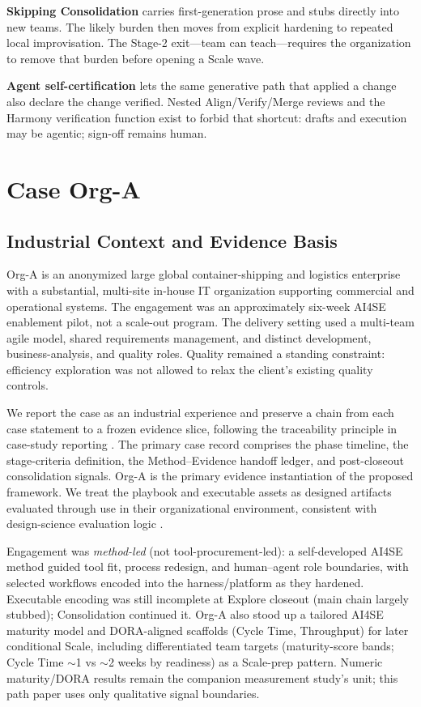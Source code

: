 \documentclass[10pt,conference]{IEEEtran}
\begin{document}
\textbf{Skipping Consolidation} carries first-generation prose and stubs
directly into new teams.  The likely burden then moves from explicit
hardening to repeated local improvisation.  The Stage-2 exit---team can
teach---requires the organization to remove that burden before opening a
Scale wave.

\textbf{Agent self-certification} lets the same generative path that applied
a change also declare the change verified.  Nested Align/Verify/Merge reviews and the
Harmony verification function exist to forbid that shortcut: drafts and
execution may be agentic; sign-off remains human.

\section{Case Org-A}
\label{sec:org-a}

\subsection{Industrial Context and Evidence Basis}

Org-A is an anonymized large global container-shipping and logistics
enterprise with a substantial, multi-site in-house IT organization
supporting commercial and operational systems.  The engagement was an
approximately six-week AI4SE enablement pilot, not a scale-out program.  The
delivery setting used a multi-team agile model, shared requirements
management, and distinct development, business-analysis, and quality roles.
Quality remained a standing constraint: efficiency exploration was not
allowed to relax the client's existing quality controls.

We report the case as an industrial experience and preserve a chain from each
case statement to a frozen evidence slice, following the traceability
principle in case-study reporting \cite{Runeson2009CaseStudy}.  The primary
case record comprises the phase timeline, the stage-criteria definition,
the Method--Evidence handoff ledger, and post-closeout consolidation signals.
Org-A is the primary evidence instantiation of the proposed framework.  We treat
the playbook and executable assets as designed artifacts evaluated through
use in their organizational environment, consistent with design-science
evaluation logic \cite{Hevner2004DSR}.

Engagement was \emph{method-led} (not tool-procurement-led): a self-developed
AI4SE method guided tool fit, process redesign, and human--agent role
boundaries, with selected workflows encoded into the harness/platform as they
hardened.
Executable encoding was still incomplete at Explore closeout (main chain largely
stubbed); Consolidation continued it.
Org-A also stood up a tailored AI4SE maturity model and DORA-aligned scaffolds
(Cycle Time, Throughput) for later conditional Scale, including differentiated
team targets (maturity-score bands; Cycle Time $\sim$1 vs $\sim$2 weeks by
readiness) as a Scale-prep pattern.
Numeric maturity/DORA results remain the companion measurement study's unit;
this path paper uses only qualitative signal boundaries.
\end{document}
